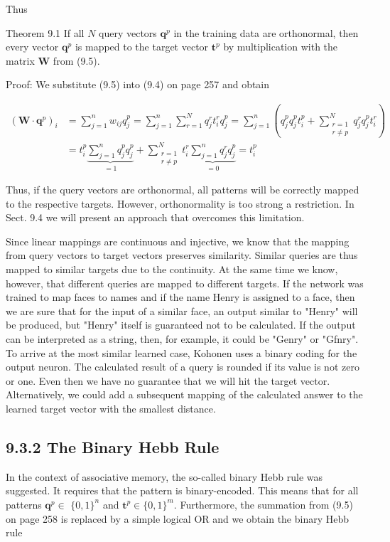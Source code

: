 \documentclass[10pt]{article}
\begin{document}
Thus

Theorem 9.1 If all $N$ query vectors $\boldsymbol{q}^{p}$ in the training data are orthonormal, then every vector $\boldsymbol{q}^{p}$ is mapped to the target vector $\boldsymbol{t}^{p}$ by multiplication with the matrix $\boldsymbol{W}$ from (9.5).

Proof: We substitute (9.5) into (9.4) on page 257 and obtain

$$
\begin{aligned}
\left(\boldsymbol{W} \cdot \boldsymbol{q}^{p}\right)_{i} & =\sum_{j=1}^{n} w_{i j} q_{j}^{p}=\sum_{j=1}^{n} \sum_{r=1}^{N} q_{j}^{r} t_{i}^{r} q_{j}^{p}=\sum_{j=1}^{n}\left(q_{j}^{p} q_{j}^{p} t_{i}^{p}+\sum_{\substack{r=1 \\
r \neq p}}^{N} q_{j}^{r} q_{j}^{p} t_{i}^{r}\right) \\
& =t_{i}^{p} \underbrace{\sum_{j=1}^{n} q_{j}^{p} q_{j}^{p}}_{=1}+\sum_{\substack{r=1 \\
r \neq p}}^{N} t_{i}^{r} \underbrace{\sum_{j=1}^{n} q_{j}^{r} q_{j}^{p}}_{=0}=t_{i}^{p}
\end{aligned}
$$

Thus, if the query vectors are orthonormal, all patterns will be correctly mapped to the respective targets. However, orthonormality is too strong a restriction. In Sect. 9.4 we will present an approach that overcomes this limitation.

Since linear mappings are continuous and injective, we know that the mapping from query vectors to target vectors preserves similarity. Similar queries are thus mapped to similar targets due to the continuity. At the same time we know, however, that different queries are mapped to different targets. If the network was trained to map faces to names and if the name Henry is assigned to a face, then we are sure that for the input of a similar face, an output similar to "Henry" will be produced, but "Henry" itself is guaranteed not to be calculated. If the output can be interpreted as a string, then, for example, it could be "Genry" or "Gfnry". To arrive at the most similar learned case, Kohonen uses a binary coding for the output neuron. The calculated result of a query is rounded if its value is not zero or one. Even then we have no guarantee that we will hit the target vector. Alternatively, we could add a subsequent mapping of the calculated answer to the learned target vector with the smallest distance.

\subsection*{9.3.2 The Binary Hebb Rule}
In the context of associative memory, the so-called binary Hebb rule was suggested. It requires that the pattern is binary-encoded. This means that for all patterns $\boldsymbol{q}^{p} \in$ $\{0,1\}^{n}$ and $\boldsymbol{t}^{p} \in\{0,1\}^{m}$. Furthermore, the summation from (9.5) on page 258 is replaced by a simple logical OR and we obtain the binary Hebb rule
\end{document}
